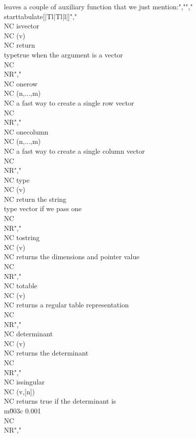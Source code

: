leaves a couple of auxiliary function that we just mention:","","\\starttabulate[|Tl|Tl|l|]","\\NC isvector      \\NC (v)       \\NC return \\type{true} when the argument is a vector \\NC \\NR","\\NC onerow        \\NC (n,...,m) \\NC a fast way to create a single row vector \\NC \\NR","\\NC onecolumn     \\NC (n,...,m) \\NC a fast way to create a single column vector \\NC \\NR","\\NC type          \\NC (v)       \\NC return the string \\type {vector} if we pass one \\NC \\NR","\\NC tostring      \\NC (v)       \\NC returns the dimensions and pointer value \\NC \\NR","\\NC totable       \\NC (v)       \\NC returns a regular table representation \\NC \\NR","\\NC determinant   \\NC (v)       \\NC returns the determinant \\NC \\NR","\\NC issingular    \\NC (v,[n])   \\NC returns true if the determinant is \\m{\u003c 0.001}\\NC \\NR","%